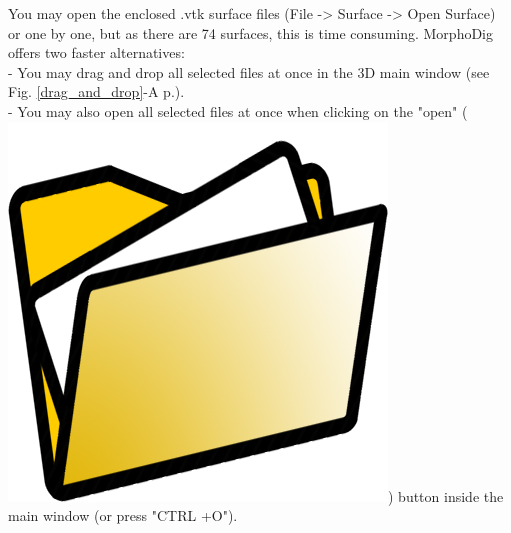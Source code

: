 \documentclass[12pt, a4paper]{book}
\begin{document}
	You may open the enclosed .vtk surface files (File -> Surface -> Open Surface) or one by one, but as there are 74 surfaces, this is time consuming. MorphoDig offers two faster alternatives:\\
- You may drag and drop all selected files at once in the 3D main window (see Fig. \ref{drag_and_drop}-A p.\pageref{drag_and_drop}).\\
- You may also open all selected files at once when clicking on the "open" (\includegraphics[scale=0.03]{../images/03/open_data.png}) button inside the main window (or press "CTRL +O").\\
\end{document}
